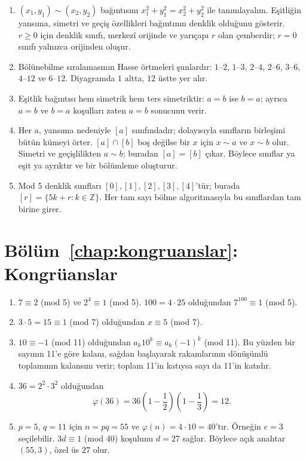 \begin{enumerate}
\item $(x_1,y_1)\sim(x_2,y_2)$ bağıntısını $x_1^2+y_1^2=x_2^2+y_2^2$ ile tanımlayalım. Eşitliğin yansıma, simetri ve geçiş özellikleri bağıntının denklik olduğunu gösterir. $r\geq0$ için denklik sınıfı, merkezî orijinde ve yarıçapı $r$ olan çemberdir; $r=0$ sınıfı yalnızca orijinden oluşur.

\item Bölünebilme sıralamasının Hasse örtmeleri şunlardır: $1$--$2$, $1$--$3$, $2$--$4$, $2$--$6$, $3$--$6$, $4$--$12$ ve $6$--$12$. Diyagramda $1$ altta, $12$ üstte yer alır.

\item Eşitlik bağıntısı hem simetrik hem ters simetriktir: $a=b$ ise $b=a$; ayrıca $a=b$ ve $b=a$ koşulları zaten $a=b$ sonucunu verir.

\item Her $a$, yansıma nedeniyle $[a]$ sınıfındadır; dolayısıyla sınıfların birleşimi bütün kümeyi örter. $[a]\cap[b]$ boş değilse bir $x$ için $x\sim a$ ve $x\sim b$ olur. Simetri ve geçişlilikten $a\sim b$; buradan $[a]=[b]$ çıkar. Böylece sınıflar ya eşit ya ayrıktır ve bir bölümleme oluşturur.

\item Mod 5 denklik sınıfları $[0],[1],[2],[3],[4]$'tür; burada $[r]=\{5k+r:k\in\mathbb Z\}$. Her tam sayı bölme algoritmasıyla bu sınıflardan tam birine girer.
\end{enumerate}

\section{Bölüm~\ref{chap:kongruanslar}: Kongrüanslar}

\begin{enumerate}
\item $7\equiv2$ (mod 5) ve $2^4\equiv1$ (mod 5). $100=4\cdot25$ olduğundan $7^{100}\equiv1$ (mod 5).

\item $3\cdot5=15\equiv1$ (mod 7) olduğundan $x\equiv5$ (mod 7).

\item $10\equiv-1$ (mod 11) olduğundan $a_k10^k\equiv a_k(-1)^k$ (mod 11). Bu yüzden bir sayının 11'e göre kalanı, sağdan başlayarak rakamlarının dönüşümlü toplamının kalansını verir; toplam 11'in katıysa sayı da 11'in katıdır.

\item $36=2^2\cdot3^2$ olduğundan
\[
\varphi(36)=36\left(1-\frac12\right)\left(1-\frac13\right)=12.
\]

\item $p=5$, $q=11$ için $n=pq=55$ ve $\varphi(n)=4\cdot10=40$'tır. Örneğin $e=3$ seçilebilir. $3d\equiv1$ (mod 40) koşulunu $d=27$ sağlar. Böylece açık anahtar $(55,3)$, özel üs $27$ olur.
\end{enumerate}

